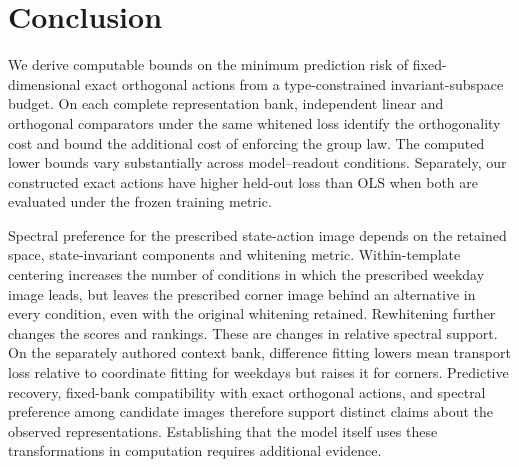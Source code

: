 \section{Conclusion}
We derive computable bounds on the minimum prediction risk of fixed-dimensional exact orthogonal actions from a type-constrained invariant-subspace budget.
On each complete representation bank, independent linear and orthogonal comparators under the same whitened loss identify the orthogonality cost and bound the additional cost of enforcing the group law.
The computed lower bounds vary substantially across model--readout conditions.
Separately, our constructed exact actions have higher held-out loss than OLS when both are evaluated under the frozen training metric.

Spectral preference for the prescribed state-action image depends on the retained space, state-invariant components and whitening metric.
Within-template centering increases the number of conditions in which the prescribed weekday image leads, but leaves the prescribed corner image behind an alternative in every condition, even with the original whitening retained.
Rewhitening further changes the scores and rankings.
These are changes in relative spectral support.
On the separately authored context bank, difference fitting lowers mean transport loss relative to coordinate fitting for weekdays but raises it for corners.
Predictive recovery, fixed-bank compatibility with exact orthogonal actions, and spectral preference among candidate images therefore support distinct claims about the observed representations.
Establishing that the model itself uses these transformations in computation requires additional evidence.
